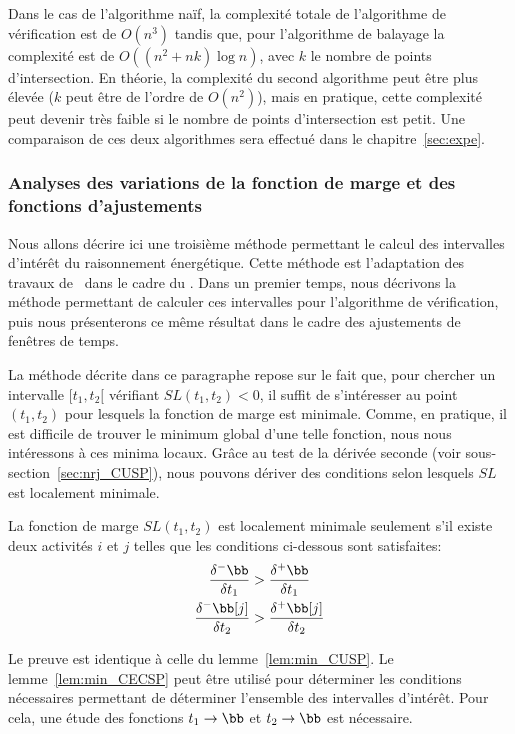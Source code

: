 Dans le cas de l'algorithme naïf, la complexité totale de l'algorithme
de vérification est de $O(n^3)$ tandis que, pour l'algorithme de
balayage la complexité est de $O((n^2+nk) \log n)$, avec $k$ le nombre
de points d'intersection. En théorie, la complexité du second
algorithme peut être plus élevée ($k$ peut être de l'ordre de
$O(n^2)$), mais en pratique, cette complexité peut devenir très faible
si le nombre de points d'intersection est petit. Une comparaison de
ces deux algorithmes sera effectué dans le chapitre~\ref{sec:expe}.

\subsubsection{Analyses des variations de la fonction de marge et des
  fonctions d'ajustements}

Nous allons décrire ici une troisième méthode permettant le calcul des
intervalles d'intérêt du raisonnement énergétique. Cette méthode est
l'adaptation des travaux de~\cite{DP} dans le cadre du \CUSP. Dans un
premier temps, nous décrivons la méthode permettant de calculer ces
intervalles pour l'algorithme de vérification, puis nous présenterons
ce même résultat dans le cadre des ajustements de fenêtres de temps. 

 La méthode décrite dans ce paragraphe repose sur le fait que, pour
 chercher un intervalle $[t_1,t_2[$ vérifiant $SL(t_1,t_2) < 0$, il
 suffit de s'intéresser au point $(t_1,t_2)$ pour lesquels la
 fonction de marge est minimale. Comme, en pratique, il est difficile
 de trouver le minimum global d'une telle fonction, nous nous
 intéressons à ces minima locaux. Grâce au test de la dérivée
 seconde (voir sous-section~\ref{sec:nrj_CUSP}), nous pouvons dériver
 des conditions selon lesquels $SL$ est localement minimale.

\begin{lemma}[\cite{DP}]
\label{lem:min_CECSP}
La fonction de marge $SL(t_1,t_2)$ est localement minimale seulement
s'il existe deux activités $i$ et $j$ telles que les conditions
ci-dessous sont satisfaites: 
\begin{align} \frac{\delta^{-}\bb}{\delta t_1} &>
\frac{\delta^{+}\bb}{\delta t_1} \label{eq:deriv1_CECSP}\\ 
\frac{\delta^{-}\bb[j]}{\delta t_2}
& > \frac{\delta^{+}\bb[j]}{\delta t_2} \label{eq:deriv2_CECSP}
\end{align}
\end{lemma}

Le preuve est identique à celle du lemme~\ref{lem:min_CUSP}. Le
lemme~\ref{lem:min_CECSP} peut être utilisé pour déterminer les
conditions nécessaires permettant de déterminer l'ensemble des
intervalles d'intérêt. Pour cela, une étude des fonctions $t_1
\rightarrow \bb$ et $t_2 \rightarrow \bb$ est nécessaire. 

